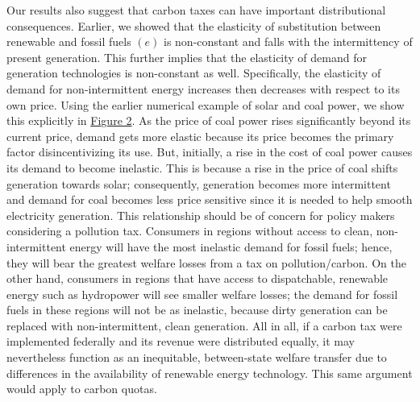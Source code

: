 \documentclass[11pt,a4paper]{extarticle}
\begin{document}
Our results also suggest that carbon taxes can have important distributional consequences. Earlier, we showed that the elasticity of substitution between renewable and fossil fuels $(e)$ is non-constant and falls with the intermittency of present generation. This further implies that the elasticity of demand for generation technologies is non-constant as well. Specifically, the elasticity of demand for non-intermittent energy increases then decreases with respect to its own price. Using the earlier numerical example of solar and coal power, we show this explicitly in \hyperref[fig:coalelas]{Figure 2}. As the price of coal power rises significantly beyond its current price, demand gets more elastic because its price becomes the primary factor disincentivizing its use. But, initially, a rise in the cost of coal power causes its demand to become inelastic. This is because a rise in the price of coal shifts generation towards solar;  consequently, generation becomes more intermittent and demand for coal becomes less price sensitive since it is needed to help smooth electricity generation. This relationship should be of concern for policy makers considering a pollution tax. Consumers in regions without access to clean, non-intermittent energy will have the most inelastic demand for fossil fuels; hence, they will bear the greatest welfare losses from a tax on pollution/carbon. On the other hand, consumers in regions that have access to dispatchable, renewable energy such as hydropower will see smaller welfare losses; the demand for fossil fuels in these regions will not be as inelastic, because dirty generation can be replaced with non-intermittent, clean generation. All in all, if a carbon tax were implemented federally and its revenue were distributed equally, it may nevertheless function as an inequitable, between-state welfare transfer due to differences in the availability of renewable energy technology. This same argument would apply  to carbon quotas.
\end{document}
